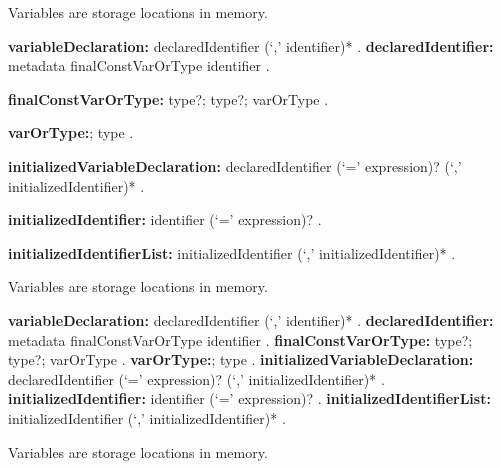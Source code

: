 \documentclass{article}
\begin{document}
\LMHash{}
Variables are storage locations in memory.

\begin{grammar}%
{\bf variableDeclaration:}%
      declaredIdentifier (`,' identifier)*%
      .%
{\bf declaredIdentifier:}
      metadata finalConstVarOrType identifier
    .

{\bf finalConstVarOrType:}\FINAL{} type?;
           \CONST{} type?;
	varOrType
    .

 {\bf varOrType:}\VAR{};
	type
    .

 {\bf initializedVariableDeclaration:}
      declaredIdentifier (`=' expression)? (`,' initializedIdentifier)* %
    .

{\bf initializedIdentifier:}
      identifier (`=' expression)? %
    .

{\bf initializedIdentifierList:}
      initializedIdentifier (`,' initializedIdentifier)*
    .%



  \end{grammar}%

\LMHash{}
Variables are storage locations in memory.

\begin{grammar}
{\bf variableDeclaration:}
      declaredIdentifier (`,' identifier)*
      .
{\bf declaredIdentifier:}
      metadata finalConstVarOrType identifier
    .
{\bf finalConstVarOrType:}\FINAL{} type?;
           \CONST{} type?;
	varOrType
    .
 {\bf varOrType:}\VAR{};
	type
    .
 {\bf initializedVariableDeclaration:}
      declaredIdentifier (`=' expression)? (`,' initializedIdentifier)* %
    .
{\bf initializedIdentifier:}
      identifier (`=' expression)? %
    .
{\bf initializedIdentifierList:}
      initializedIdentifier (`,' initializedIdentifier)*
    .
  \end{grammar}

\LMHash{}
Variables are storage locations in memory.
\end{document}
